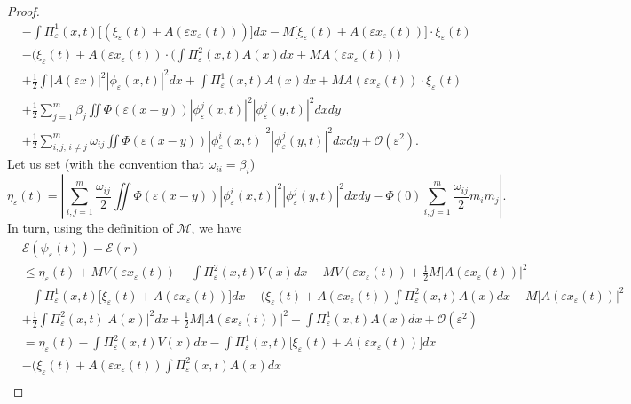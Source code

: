\documentclass[11pt]{amsart}
\numberwithin{equation}{section}
\theoremstyle{definition}
\begin{document}
\begin{proof}
\begin{align*}
& -\int \Pi_{\varepsilon}^1(x,
t)\Big[(\xi_{\varepsilon}(t)+A({\varepsilon} x_{\varepsilon}(t)))\Big]dx-M\Big[\xi_{\varepsilon}(t)+A({\varepsilon} x_{\varepsilon}(t))\Big]\cdot\xi_{\varepsilon}(t)\\
& -(\xi_{\varepsilon}(t) +A({\varepsilon} x_{\varepsilon}(t))\cdot \Big(\int \Pi_{\varepsilon}^2(x,
t) A(x)dx+MA({\varepsilon} x_{\varepsilon}(t))\Big)\\
& +\frac{1}{2}\int |A({\varepsilon} x)|^2|\phi_{\varepsilon}(x,t)|^2dx
+\int \Pi_{\varepsilon}^1(x,t)A(x)dx+MA({\varepsilon} x_{\varepsilon}(t))\cdot \xi_{\varepsilon}(t)  \\
& +\frac{1}{2}\sum_{j=1}^m\beta_j \iint \Phi({\varepsilon} (x-y))|\phi_{\varepsilon}^j(x,t)|^2|\phi^j_{\varepsilon}(y,t)|^2 dx dy \\
& +\frac{1}{2}\sum_{i,j,\,i\neq j}^m\omega_{ij} \iint
\Phi({\varepsilon}(x-y))|\phi_{\varepsilon}^i(x,t)|^2|\phi^j_{\varepsilon}(y,t)|^2 dx dy+{\mathcal O}({\varepsilon}^2).
\end{align*}
    Let us set (with the convention that $\omega_{ii}=\beta_i$)
    \begin{equation*}
 \eta_{\varepsilon}(t)=\left|\sum_{i,j=1}^m \frac{\omega_{ij}}{2}\iint \Phi({\varepsilon} (x-y))
|\phi_{\varepsilon}^i(x,t)|^2|\phi_{\varepsilon}^j(y,t)|^2dxdy-\Phi(0)\sum_{i,j=1}^m \frac{\omega_{ij}}{2} m_im_j\right|.
\end{equation*}
In turn, using the definition of ${\mathcal M}$, we have
\begin{align*}
& \mathcal E(\psi_{\varepsilon}(t)) -\mathcal E(r) \\
&\leq \eta_{\varepsilon}(t)+ MV({\varepsilon} x_{\varepsilon}(t)) -\int \Pi_{\varepsilon}^2(x, t)V(x)dx-MV({\varepsilon} x_{\varepsilon}(t))
+\frac12 M|A({\varepsilon} x_{\varepsilon}(t))|^2 \\
& -\int \Pi_{\varepsilon}^1(x, t)\Big[\xi_{\varepsilon}(t)+A({\varepsilon} x_{\varepsilon}(t))\Big]dx
-(\xi_{\varepsilon}(t) +A({\varepsilon} x_{\varepsilon}( t))\int \Pi_{\varepsilon}^2(x,
t) A(x)dx-M|A({\varepsilon} x_{\varepsilon}(t))|^2\\
& +\frac{1}{2}\int \Pi_{\varepsilon}^2(x, t)|A(x)|^2dx +\frac 1 2
M|A({\varepsilon} x_{\varepsilon}(t))|^2+\int \Pi_{\varepsilon}^1(x, t)A(x)dx+{\mathcal O}({\varepsilon}^2)\\
& =\eta_{\varepsilon}(t)-\int \Pi_{\varepsilon}^2(x, t)V(x)dx
 -\int \Pi_{\varepsilon}^1(x, t)\Big[\xi_{\varepsilon}( t)+A({\varepsilon} x_{\varepsilon}( t))\Big]dx \\
& -(\xi_{\varepsilon}( t) +A({\varepsilon} x_{\varepsilon}( t))\int \Pi_{\varepsilon}^2(x,t) A(x)dx  \\

\end{align*}
\end{proof}
\end{document}

